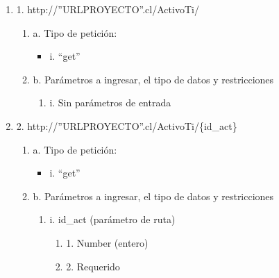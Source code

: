 \begin{enumerate}
    \item 1. http://”URLPROYECTO”.cl/ActivoTi/
    \begin{enumerate}
        \item a. Tipo de petición:
            \begin{itemize}
               \item i. “get”
            \end{itemize}
        \item b. Parámetros a ingresar, el tipo de datos y restricciones
            \begin{enumerate}
                \item i. Sin parámetros de entrada
            \end{enumerate}
    \end{enumerate}

    \item 2. http://”URLPROYECTO”.cl/ActivoTi/\{id\_act\}
    \begin{enumerate}
        \item a. Tipo de petición:
            \begin{itemize}
               \item i. “get”
            \end{itemize}
        \item b. Parámetros a ingresar, el tipo de datos y restricciones
            \begin{enumerate}
                \item i. id\_act (parámetro de ruta)
                    \begin{enumerate}
                        \item 1. Number (entero)
                        \item 2. Requerido
                    \end{enumerate}
            \end{enumerate}
    \end{enumerate}


\end{enumerate}
